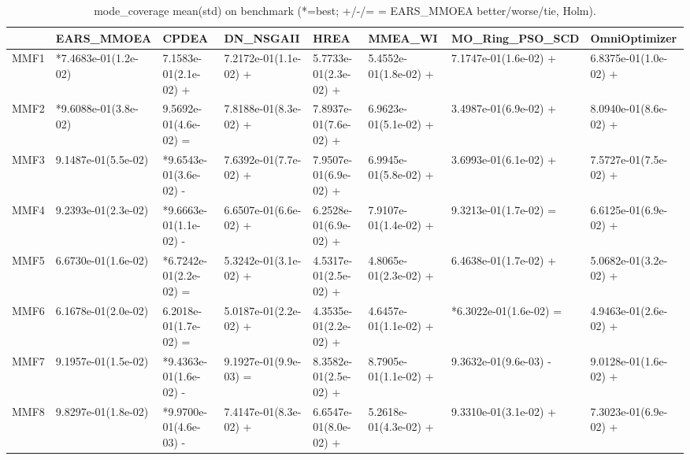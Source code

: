 \begin{table}[t]
\centering
\caption{mode_coverage mean(std) on benchmark (*=best; +/-/= = EARS_MMOEA better/worse/tie, Holm).}
\label{tab:benchmark_mode_coverage}
\begin{tabular}{llllllll}
\toprule
 & EARS\_MMOEA & CPDEA & DN\_NSGAII & HREA & MMEA\_WI & MO\_Ring\_PSO\_SCD & OmniOptimizer \\
\midrule
MMF1 & *7.4683e-01(1.2e-02) & 7.1583e-01(2.1e-02) + & 7.2172e-01(1.1e-02) + & 5.7733e-01(2.3e-02) + & 5.4552e-01(1.8e-02) + & 7.1747e-01(1.6e-02) + & 6.8375e-01(1.0e-02) + \\
MMF2 & *9.6088e-01(3.8e-02) & 9.5692e-01(4.6e-02) = & 7.8188e-01(8.3e-02) + & 7.8937e-01(7.6e-02) + & 6.9623e-01(5.1e-02) + & 3.4987e-01(6.9e-02) + & 8.0940e-01(8.6e-02) + \\
MMF3 & 9.1487e-01(5.5e-02) & *9.6543e-01(3.6e-02) - & 7.6392e-01(7.7e-02) + & 7.9507e-01(6.9e-02) + & 6.9945e-01(5.8e-02) + & 3.6993e-01(6.1e-02) + & 7.5727e-01(7.5e-02) + \\
MMF4 & 9.2393e-01(2.3e-02) & *9.6663e-01(1.1e-02) - & 6.6507e-01(6.6e-02) + & 6.2528e-01(6.9e-02) + & 7.9107e-01(1.4e-02) + & 9.3213e-01(1.7e-02) = & 6.6125e-01(6.9e-02) + \\
MMF5 & 6.6730e-01(1.6e-02) & *6.7242e-01(2.2e-02) = & 5.3242e-01(3.1e-02) + & 4.5317e-01(2.5e-02) + & 4.8065e-01(2.3e-02) + & 6.4638e-01(1.7e-02) + & 5.0682e-01(3.2e-02) + \\
MMF6 & 6.1678e-01(2.0e-02) & 6.2018e-01(1.7e-02) = & 5.0187e-01(2.2e-02) + & 4.3535e-01(2.2e-02) + & 4.6457e-01(1.1e-02) + & *6.3022e-01(1.6e-02) = & 4.9463e-01(2.6e-02) + \\
MMF7 & 9.1957e-01(1.5e-02) & *9.4363e-01(1.6e-02) - & 9.1927e-01(9.9e-03) = & 8.3582e-01(2.5e-02) + & 8.7905e-01(1.1e-02) + & 9.3632e-01(9.6e-03) - & 9.0128e-01(1.6e-02) + \\
MMF8 & 9.8297e-01(1.8e-02) & *9.9700e-01(4.6e-03) - & 7.4147e-01(8.3e-02) + & 6.6547e-01(8.0e-02) + & 5.2618e-01(4.3e-02) + & 9.3310e-01(3.1e-02) + & 7.3023e-01(6.9e-02) + \\
\bottomrule
\end{tabular}
\end{table}
